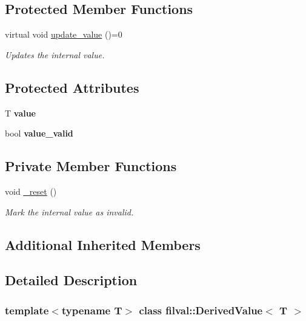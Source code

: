 \subsection*{Protected Member Functions}
\begin{DoxyCompactItemize}
\item 
virtual void \hyperlink{classfilval_1_1DerivedValue_a74e04450a550454510329a9e6b941304}{update\+\_\+value} ()=0
\begin{DoxyCompactList}\small\item\em Updates the internal value. \end{DoxyCompactList}\end{DoxyCompactItemize}
\subsection*{Protected Attributes}
\begin{DoxyCompactItemize}
\item 
\hypertarget{classfilval_1_1DerivedValue_a2b010ce280e2e3b06156870ea08804cc}{}\label{classfilval_1_1DerivedValue_a2b010ce280e2e3b06156870ea08804cc} 
T {\bfseries value}
\item 
\hypertarget{classfilval_1_1DerivedValue_ae946e1157648857534b5da312be3edf7}{}\label{classfilval_1_1DerivedValue_ae946e1157648857534b5da312be3edf7} 
bool {\bfseries value\+\_\+valid}
\end{DoxyCompactItemize}
\subsection*{Private Member Functions}
\begin{DoxyCompactItemize}
\item 
void \hyperlink{classfilval_1_1DerivedValue_a07fef8f98ae4b47e2c4d0f467aa0d6e3}{\+\_\+reset} ()
\begin{DoxyCompactList}\small\item\em Mark the internal value as invalid. \end{DoxyCompactList}\end{DoxyCompactItemize}
\subsection*{Additional Inherited Members}


\subsection{Detailed Description}
\subsubsection*{template$<$typename T$>$\newline
class filval\+::\+Derived\+Value$<$ T $>$}

